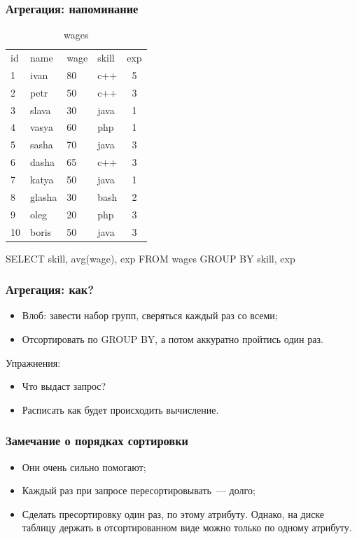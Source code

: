 \documentclass{beamer}
\begin{document}
\begin{frame}
\frametitle{Агрегация: напоминание}
\begin{table}
  \begin{tabular}{ l | l | l | l | c }
    id & name & wage & skill & exp \\
    1 & ivan & 80 & c++ & 5 \\  
    2 & petr & 50 & c++ & 3 \\
    3 & slava & 30 & java & 1 \\
    4 & vasya & 60 & php & 1 \\
    5 & sasha & 70 & java & 3 \\
    6 & dasha & 65 & c++ & 3 \\
    7 & katya & 50 & java & 1 \\        
    8 & glasha & 30 & bash & 2 \\
    9 & oleg & 20 & php & 3 \\    
    10 & boris & 50 & java & 3 \\    
  \end{tabular}
  \caption{wages}
\end{table}

SELECT skill, avg(wage), exp FROM wages GROUP BY skill, exp

\end{frame}

\begin{frame}
\frametitle{Агрегация: как?}
\begin{itemize}
  \item Влоб: завести набор групп, сверяться каждый раз со всеми; 
  \item Отсортировать по GROUP BY, а потом аккуратно пройтись один раз.
\end{itemize}

Упражнения: 

\begin{itemize}
  \item Что выдаст запрос?
  \item Расписать как будет происходить вычисление.
\end{itemize}
\end{frame}


\begin{frame}
\frametitle{Замечание о порядках сортировки}
\begin{itemize}
  \setlength\itemsep{1em}
  \item Они очень сильно помогают;
  \item Каждый раз при запросе пересортировывать~--- долго;
  \item Сделать пресортировку один раз, по этому атрибуту. Однако, на диске таблицу держать в отсортированном виде можно только по одному атрибуту.
\end{itemize}
\end{frame}
\end{document}
